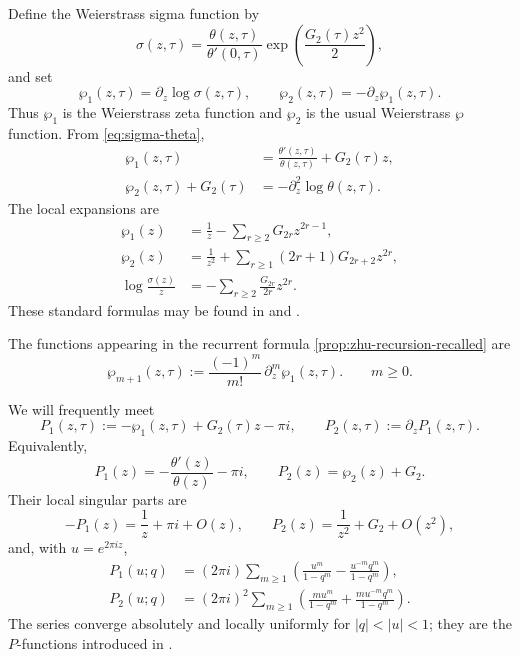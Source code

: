 \documentclass[11pt,a4paper]{amsart}
\numberwithin{equation}{section}
\theoremstyle{definition}
\theoremstyle{remark}
\newcommand{\ii}{i}
\newcommand{\e}{e}
\begin{document}
Define the Weierstrass sigma function by
\begin{equation}
 \sigma(z,\tau)=\frac{\theta(z,\tau)}{\theta'(0,\tau)}
 \exp\!\left(\frac{G_2(\tau)z^2}{2}\right),
 \label{eq:sigma-theta}
\end{equation}
and set
\begin{equation}
 \wp_1(z,\tau)=\partial_z\log\sigma(z,\tau),
 \qquad
 \wp_2(z,\tau)=-\partial_z\wp_1(z,\tau).
 \label{eq:wp1-wp2}
\end{equation}
Thus $\wp_1$ is the Weierstrass zeta function and $\wp_2$ is the usual
Weierstrass $\wp$ function.  From \eqref{eq:sigma-theta},
\begin{align}
 \wp_1(z,\tau)
 &=\frac{\theta'(z,\tau)}{\theta(z,\tau)}+G_2(\tau)z,
 \label{eq:wp1-theta}\\
 \wp_2(z,\tau)+G_2(\tau)
 &=-\partial_z^2\log\theta(z,\tau).
 \label{eq:wp2-theta}
\end{align}
The local expansions are
\begin{align}
 \wp_1(z)&=\frac1z-\sum_{r\geq2}G_{2r}z^{2r-1},
 \label{eq:wp1-expansion}\\
 \wp_2(z)&=\frac1{z^2}
 +\sum_{r\geq1}(2r+1)G_{2r+2}z^{2r},
 \label{eq:wp2-expansion}\\
 \log\frac{\sigma(z)}z
 &=-\sum_{r\geq2}\frac{G_{2r}}{2r}z^{2r}.
 \label{eq:sigma-expansion}
\end{align}
These standard formulas may be found in
\cite{WhittakerWatson} and \cite{Fay}.

The functions appearing in the recurrent formula \eqref{prop:zhu-recursion-recalled} are
\begin{equation*}
 \wp_{m+1}(z,\tau)
 :=\frac{(-1)^m}{m!}\,\partial_z^m\wp_1(z,\tau).\qquad m\geq 0.
\end{equation*}

We will frequently meet 
\begin{equation}
 P_1(z,\tau):=-\wp_1(z,\tau)+G_2(\tau)z-\pi\ii,
 \qquad
 P_2(z,\tau):=\partial_zP_1(z,\tau).
 \label{eq:P1P2}
\end{equation}
Equivalently,
\begin{equation*}
 P_1(z)=-\frac{\theta'(z)}{\theta(z)}-\pi\ii,
 \qquad P_2(z)=\wp_2(z)+G_2.
\end{equation*}
Their local singular parts are
\begin{equation}
 -P_1(z)=\frac1z+\pi\ii+O(z),
 \qquad P_2(z)=\frac1{z^2}+G_2+O(z^2),
 \label{eq:P-principal-parts}
\end{equation}
and, with $u=\e^{2\pi\ii z}$,
\begin{align}
 P_1(u;q)&=(2\pi\ii)\sum_{m\geq1}
 \left(\frac{u^m}{1-q^m}-\frac{u^{-m}q^m}{1-q^m}\right),
 \label{eq:P1-Fourier}\\
 P_2(u;q)&=(2\pi\ii)^2\sum_{m\geq1}
 \left(\frac{m u^m}{1-q^m}+\frac{m u^{-m}q^m}{1-q^m}\right).
 \label{eq:P2-Fourier}
\end{align}
The series converge absolutely and locally uniformly for $|q|<|u|<1$; they are the $P$-functions introduced in \cite{Zhu}.
\end{document}
